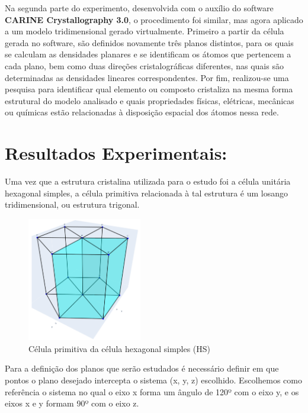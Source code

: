 \documentclass[10pt,twocolumn,letterpaper]{article}
\begin{document}
\hspace{1cm} Na segunda parte do experimento, desenvolvida com o auxílio do software \textbf{CARINE Crystallography 3.0}, o procedimento foi similar, mas agora aplicado a um modelo tridimensional gerado virtualmente. Primeiro a partir da célula gerada no software, são definidos novamente três planos distintos, para os quais se calculam as densidades planares e se identificam os átomos que pertencem a cada plano, bem como duas direções cristalográficas diferentes, nas quais são determinadas as densidades lineares correspondentes. Por fim, realizou-se uma pesquisa para identificar qual elemento ou composto cristaliza na mesma forma estrutural do modelo analisado e quais propriedades físicas, elétricas, mecânicas ou químicas estão relacionadas à disposição espacial dos átomos nessa rede.

\section{Resultados Experimentais:}

\hspace{1cm} Uma vez que a estrutura cristalina utilizada para o estudo foi a célula unitária hexagonal simples, a célula  primitiva relacionada à tal estrutura é um losango tridimensional, ou estrutura trigonal.

\begin{figure}
    \centering
    \includegraphics[width=5cm]{PrimitiveCell.png}
    \caption{Célula primitiva da célula hexagonal simples (HS)}
    \label{fig:label}
\end{figure}

\vspace{1cm}

\hspace{1cm} Para a definição dos planos que serão estudados é necessário definir em que pontos o plano desejado intercepta o sistema (x, y, z) escolhido. Escolhemos como referência o sistema no qual o eixo x forma um ângulo de 120º com o eixo y, e os eixos x e y formam 90º com o eixo z.
\end{document}
